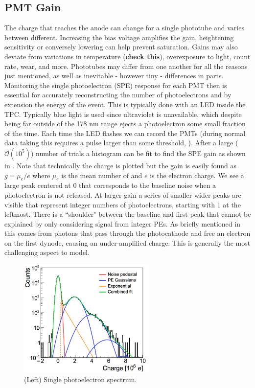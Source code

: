 \subsection{PMT Gain}
\label{subsec:det_char_pmt_gain}
The charge that reaches the anode can change for a single phototube and varies between different.  Increasing the bias voltage amplifies
the gain, heightening sensitivity or conversely lowering can help prevent saturation.  Gains may also deviate from variations in
temperature (\textbf{check this}), overexposure to light, count rate, wear, and more.  Phototubes may differ from one another
for all the reasons just mentioned, as well as inevitable - however tiny - differences in parts.  Monitoring the single photoelectron (SPE)
response for each PMT then is essential for accurately reconstructing the number of photoelectrons and by extension the energy of the
event.  This is typically done with an LED inside the TPC.  Typically blue light is used since ultraviolet is unavailable, which despite
being far outside of the 178 nm range ejects a photoelectron some small fraction of the time.  Each time the LED flashes we can record the
PMTs (during normal data taking this requires a pulse larger than some threshold, ).  After a large
($\mathcal{O}(10^{5})$)
number of trials a histogram can be fit to find the SPE gain as shown in .  Note that technically the charge
is plotted but the gain is easily found as $g = \mu_{e} / e$ where $\mu_{e}$ is the mean number of \electron and $e$ is the electron charge.  We
see a large peak centered at 0 that corresponds to the baseline noise when a photoelectron is not released.  At larger gain a series of
smaller wider peaks are visible that represent integer numbers of photoelectrons, starting with 1 at the leftmost.  There is a ``shoulder"
between the baseline and first peak that cannot be explained by only considering signal from integer PEs.  As briefly mentioned in
 this comes from photons that pass through the photocathode and free an electron on the first dynode, causing an
under-amplified charge.  This is generally the most challenging aspect to model.

\begin{figure}
\centering
\includegraphics[width=0.6\textwidth]{SPESpectrum}
\caption{(Left) Single photoelectron spectrum.}
\label{fig:xenon1t_pmt_spe}
\end{figure}

